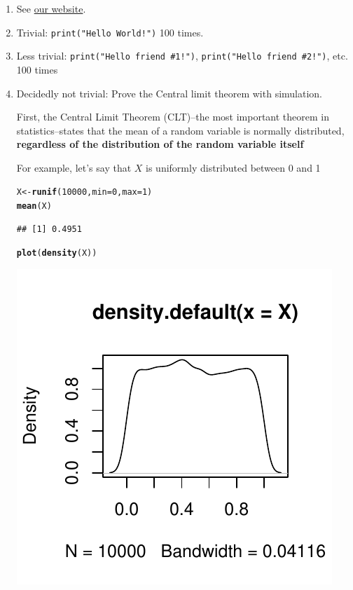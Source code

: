 \documentclass{article}\usepackage[]{graphicx}\usepackage[]{color}
\makeatletter
\def\maxwidth{ %
  \ifdim\Gin@nat@width>\linewidth
    \linewidth
  \else
    \Gin@nat@width
  \fi
}
\newcommand{\hlnum}[1]{\textcolor[rgb]{0.686,0.059,0.569}{#1}}%
\newcommand{\hlstd}[1]{\textcolor[rgb]{0.345,0.345,0.345}{#1}}%
\newcommand{\hlkwb}[1]{\textcolor[rgb]{0.69,0.353,0.396}{#1}}%
\newcommand{\hlkwc}[1]{\textcolor[rgb]{0.333,0.667,0.333}{#1}}%
\newcommand{\hlkwd}[1]{\textcolor[rgb]{0.737,0.353,0.396}{\textbf{#1}}}%
\newenvironment{kframe}{%
 \def\at@end@of@kframe{}%
 \ifinner\ifhmode%
  \def\at@end@of@kframe{\end{minipage}}%
  \begin{minipage}{\columnwidth}%
 \fi\fi%
 \def\FrameCommand##1{\hskip\@totalleftmargin \hskip-\fboxsep
 \colorbox{shadecolor}{##1}\hskip-\fboxsep
     \hskip-\linewidth \hskip-\@totalleftmargin \hskip\columnwidth}%
 \MakeFramed {\advance\hsize-\width
   \@totalleftmargin\z@ \linewidth\hsize
   \@setminipage}}%
 {\par\unskip\endMakeFramed%
 \at@end@of@kframe}
\newenvironment{knitrout}{}{} %
\makeatother
\begin{document}
\begin{enumerate}
\item See \href{http://polsci630.herokuapp.com/meetings}{our website}.
\item Trivial: \verb`print("Hello World!")` 100 times.
\item Less trivial: \verb`print("Hello friend #1!")`, \verb`print("Hello friend #2!")`, etc. 100 times
\item Decidedly not trivial: Prove the Central limit theorem with simulation.

First, the Central Limit Theorem (CLT)--the most important theorem in statistics--states that the mean of a random variable is normally distributed, \textbf{regardless of the distribution of the random variable itself}

For example, let's say that $X$ is uniformly distributed between 0 and 1

\begin{knitrout}
\color{fgcolor}\begin{kframe}
\begin{alltt}
\hlstd{X} \hlkwb{<-} \hlkwd{runif}\hlstd{(}\hlnum{10000}\hlstd{,} \hlkwc{min}\hlstd{=}\hlnum{0}\hlstd{,} \hlkwc{max}\hlstd{=}\hlnum{1}\hlstd{)}
\hlkwd{mean}\hlstd{(X)}
\end{alltt}
\begin{verbatim}
## [1] 0.4951
\end{verbatim}
\begin{alltt}
\hlkwd{plot}\hlstd{(}\hlkwd{density}\hlstd{(X))}
\end{alltt}
\end{kframe}
\includegraphics[width=\maxwidth]{figure/unnamed-chunk-5} 


\end{knitrout}
\end{enumerate}
\end{document}

